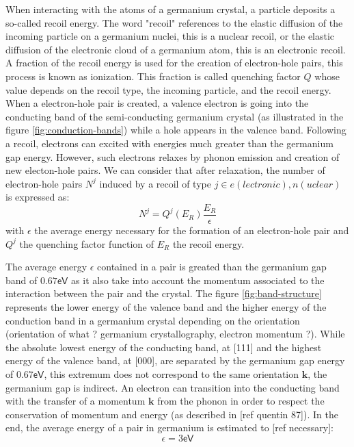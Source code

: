 When interacting with the atoms of a germanium crystal, a particle deposits a so-called recoil energy. The word "recoil" references to the elastic diffusion of the incoming particle on a germanium nuclei, this is a nuclear recoil, or the elastic diffusion of the electronic cloud of a germanium atom, this is an electronic recoil. A fraction of the recoil energy is used for the creation of electron-hole pairs, this process is known as ionization. This fraction is called quenching factor $Q$ whose value depends on the recoil type, the incoming particle, and the recoil energy. When a electron-hole pair is created, a valence electron is going into the conducting band of the semi-conducting germanium crystal (as illustrated in the figure \ref{fig:conduction-bands}) while a hole appears in the valence band. Following a recoil, electrons can excited with energies much greater than the germanium gap energy. However, such electrons relaxes by phonon emission and creation of new electon-hole pairs. We can consider that after relaxation, the number of electron-hole pairs $N^j$ induced by a recoil of type $j \in {e(lectronic), n(uclear)}$ is expressed as:
\begin{equation}
\label{eq:number-pairs}
N^j = Q^j \left( E_R \right) \frac{E_R}{\epsilon}
\end{equation}
with $\epsilon$ the average energy necessary for the formation of an electron-hole pair and $Q^j$ the quenching factor function of $E_R$ the recoil energy.

The average energy $\epsilon$ contained in a pair is greated than the germanium gap band of $0.67\textsf{eV}$ as it also take into account the momentum associated to the interaction between the pair and the crystal. The figure \ref{fig:band-structure} represents the lower energy of the valence band and the higher energy of the conduction band in a germanium crystal depending on the orientation (orientation of what ? germanium crystallography, electron momentum ?). While the absolute lowest energy of the conducting band, at [111] and the highest energy of the valence band, at [000], are separated by the germanium gap energy of $0.67\textsf{eV}$, this extremum does not correspond to the same orientation $\bm{k}$, the germanium gap is indirect. An electron can transition into the conducting band with the transfer of a momentum $\bm{k}$ from the phonon in order to respect the conservation of momentum and energy (as described in [ref quentin 87]). In the end, the average energy of a pair in germanium is estimated to [ref necessary]:
\begin{equation}
\label{eq:energy-pair}
\epsilon = 3 \textsf{eV}
\end{equation} 

